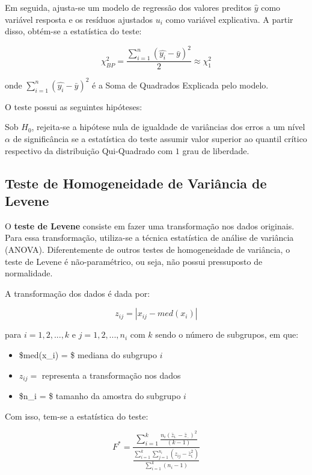 \documentclass[
]{estat/estat}
\providecommand{\tightlist}{%
  \setlength{\itemsep}{0pt}\setlength{\parskip}{0pt}}\usepackage{longtable,booktabs,array}
\begin{document}
Em seguida, ajusta-se um modelo de regressão dos valores preditos
\(\hat{y}\) como variável resposta e os resíduos ajustados \(u_i\) como
variável explicativa. A partir disso, obtém-se a estatística do teste:

\[ \chi^2_{BP} = \frac{\displaystyle \sum^n_{i=1}\left(\hat{y_i} - \bar{y}\right)^2}{2} \approx \chi^2_{1} \]

onde \(\displaystyle \sum^n_{i=1}\left(\hat{y_i} - \bar{y}\right)^2\) é
a Soma de Quadrados Explicada pelo modelo.

O teste possui as seguintes hipóteses:


Sob \(H_0\), rejeita-se a hipótese nula de igualdade de variâncias dos
erros a um nível \(\alpha\) de significância se a estatística do teste
assumir valor superior ao quantil crítico respectivo da distribuição
Qui-Quadrado com \(1\) grau de liberdade.

\subsection{Teste de Homogeneidade de Variância de
Levene}\label{teste-de-homogeneidade-de-variuxe2ncia-de-levene}

O \textbf{teste de Levene} consiste em fazer uma transformação nos dados
originais. Para essa transformação, utiliza-se a técnica estatística de
análise de variância (ANOVA). Diferentemente de outros testes de
homogeneidade de variância, o teste de Levene é não-paramétrico, ou
seja, não possui pressuposto de normalidade.

A transformação dos dados é dada por:

\[ z_{ij} = |x_{ij} - med(x_i)| \]

para \(i=1,2,...,k\) e \(j=1,2,...,n_i\) com \(k\) sendo o número de
subgrupos, em que:

\begin{itemize}
\tightlist
\item
  \$med(x\_i) = \$ mediana do subgrupo \(i\)
\item
  \(z_{ij} =\) representa a transformação nos dados
\item
  \$n\_i = \$ tamanho da amostra do subgrupo \(i\)
\end{itemize}

Com isso, tem-se a estatística do teste:

\begin{equation}
F^* = \frac{\displaystyle \sum_{i=1}^{k}\frac{n_i(\bar{z}_{i.} - \bar{z}_{..})^2}{(k-1)}}{\frac{\displaystyle \sum_{i=1}^{k}\displaystyle \sum_{j=1}^{n_i}(z_{ij}-\bar{z}_{i.}^2)}{\displaystyle \sum_{i=1}^{k}(n_i-1)}} \nonumber
\end{equation}
\end{document}
